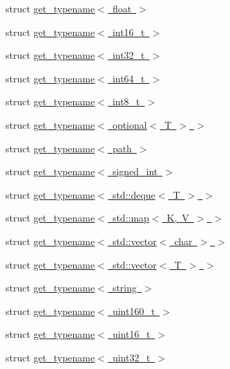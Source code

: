 \begin{DoxyCompactItemize}
\item 
struct \mbox{\hyperlink{structfc_1_1get__typename_3_01float_01_4}{get\+\_\+typename$<$ float $>$}}
\item 
struct \mbox{\hyperlink{structfc_1_1get__typename_3_01int16__t_01_4}{get\+\_\+typename$<$ int16\+\_\+t $>$}}
\item 
struct \mbox{\hyperlink{structfc_1_1get__typename_3_01int32__t_01_4}{get\+\_\+typename$<$ int32\+\_\+t $>$}}
\item 
struct \mbox{\hyperlink{structfc_1_1get__typename_3_01int64__t_01_4}{get\+\_\+typename$<$ int64\+\_\+t $>$}}
\item 
struct \mbox{\hyperlink{structfc_1_1get__typename_3_01int8__t_01_4}{get\+\_\+typename$<$ int8\+\_\+t $>$}}
\item 
struct \mbox{\hyperlink{structfc_1_1get__typename_3_01optional_3_01_t_01_4_01_4}{get\+\_\+typename$<$ optional$<$ T $>$ $>$}}
\item 
struct \mbox{\hyperlink{structfc_1_1get__typename_3_01path_01_4}{get\+\_\+typename$<$ path $>$}}
\item 
struct \mbox{\hyperlink{structfc_1_1get__typename_3_01signed__int_01_4}{get\+\_\+typename$<$ signed\+\_\+int $>$}}
\item 
struct \mbox{\hyperlink{structfc_1_1get__typename_3_01std_1_1deque_3_01_t_01_4_01_4}{get\+\_\+typename$<$ std\+::deque$<$ T $>$ $>$}}
\item 
struct \mbox{\hyperlink{structfc_1_1get__typename_3_01std_1_1map_3_01_k_00_01_v_01_4_01_4}{get\+\_\+typename$<$ std\+::map$<$ K, V $>$ $>$}}
\item 
struct \mbox{\hyperlink{structfc_1_1get__typename_3_01std_1_1vector_3_01char_01_4_01_4}{get\+\_\+typename$<$ std\+::vector$<$ char $>$ $>$}}
\item 
struct \mbox{\hyperlink{structfc_1_1get__typename_3_01std_1_1vector_3_01_t_01_4_01_4}{get\+\_\+typename$<$ std\+::vector$<$ T $>$ $>$}}
\item 
struct \mbox{\hyperlink{structfc_1_1get__typename_3_01string_01_4}{get\+\_\+typename$<$ string $>$}}
\item 
struct \mbox{\hyperlink{structfc_1_1get__typename_3_01uint160__t_01_4}{get\+\_\+typename$<$ uint160\+\_\+t $>$}}
\item 
struct \mbox{\hyperlink{structfc_1_1get__typename_3_01uint16__t_01_4}{get\+\_\+typename$<$ uint16\+\_\+t $>$}}
\item 
struct \mbox{\hyperlink{structfc_1_1get__typename_3_01uint32__t_01_4}{get\+\_\+typename$<$ uint32\+\_\+t $>$}}

\end{DoxyCompactItemize}
